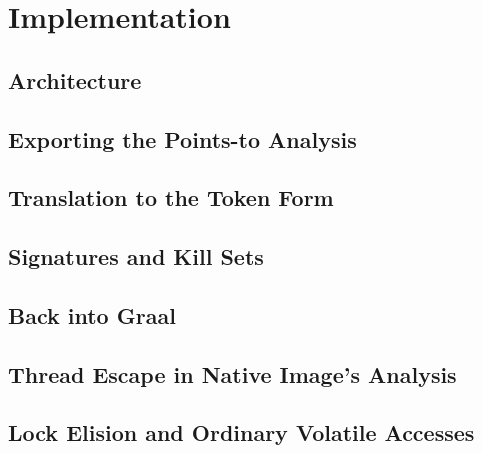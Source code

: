 \chapter{Implementation}\label{chap:implementation}

\section{Architecture}\label{sec:impl-architecture}

\section{Exporting the Points-to Analysis}\label{sec:impl-export}

\section{Translation to the Token Form}\label{sec:impl-translation}

\section{Signatures and Kill Sets}\label{sec:impl-kills}

\section{Back into Graal}\label{sec:impl-graal}

\section{Thread Escape in Native Image's Analysis}\label{sec:impl-thread-escape}

\section{Lock Elision and Ordinary Volatile Accesses}\label{sec:impl-elision}
